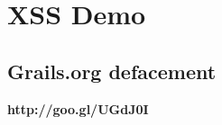 
\section{XSS Demo}

\subsection{Grails.org defacement}

{
\begin{frame}[plain]
  \vspace{-6cm}
  \begin{center}
    \LARGE\bfseries
    http://goo.gl/UGdJ0I
  \end{center}
\end{frame}
}
